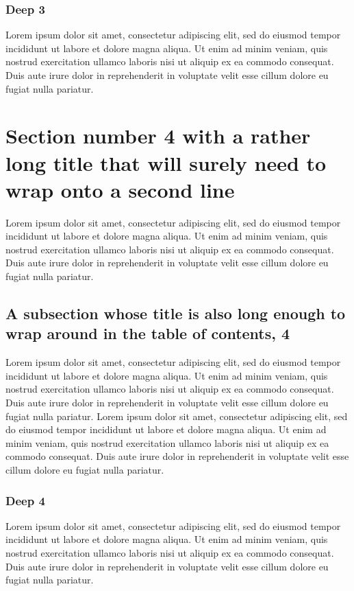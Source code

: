 \documentclass[11pt]{article}
\begin{document}
\subsubsection{Deep 3}
Lorem ipsum dolor sit amet, consectetur adipiscing elit, sed do eiusmod tempor incididunt ut labore et dolore magna aliqua. Ut enim ad minim veniam, quis nostrud exercitation ullamco laboris nisi ut aliquip ex ea commodo consequat. Duis aute irure dolor in reprehenderit in voluptate velit esse cillum dolore eu fugiat nulla pariatur.

\section{Section number 4 with a rather long title that will surely need to wrap onto a second line}
Lorem ipsum dolor sit amet, consectetur adipiscing elit, sed do eiusmod tempor incididunt ut labore et dolore magna aliqua. Ut enim ad minim veniam, quis nostrud exercitation ullamco laboris nisi ut aliquip ex ea commodo consequat. Duis aute irure dolor in reprehenderit in voluptate velit esse cillum dolore eu fugiat nulla pariatur.

\subsection{A subsection whose title is also long enough to wrap around in the table of contents, 4}
Lorem ipsum dolor sit amet, consectetur adipiscing elit, sed do eiusmod tempor incididunt ut labore et dolore magna aliqua. Ut enim ad minim veniam, quis nostrud exercitation ullamco laboris nisi ut aliquip ex ea commodo consequat. Duis aute irure dolor in reprehenderit in voluptate velit esse cillum dolore eu fugiat nulla pariatur. Lorem ipsum dolor sit amet, consectetur adipiscing elit, sed do eiusmod tempor incididunt ut labore et dolore magna aliqua. Ut enim ad minim veniam, quis nostrud exercitation ullamco laboris nisi ut aliquip ex ea commodo consequat. Duis aute irure dolor in reprehenderit in voluptate velit esse cillum dolore eu fugiat nulla pariatur.

\subsubsection{Deep 4}
Lorem ipsum dolor sit amet, consectetur adipiscing elit, sed do eiusmod tempor incididunt ut labore et dolore magna aliqua. Ut enim ad minim veniam, quis nostrud exercitation ullamco laboris nisi ut aliquip ex ea commodo consequat. Duis aute irure dolor in reprehenderit in voluptate velit esse cillum dolore eu fugiat nulla pariatur.
\end{document}
